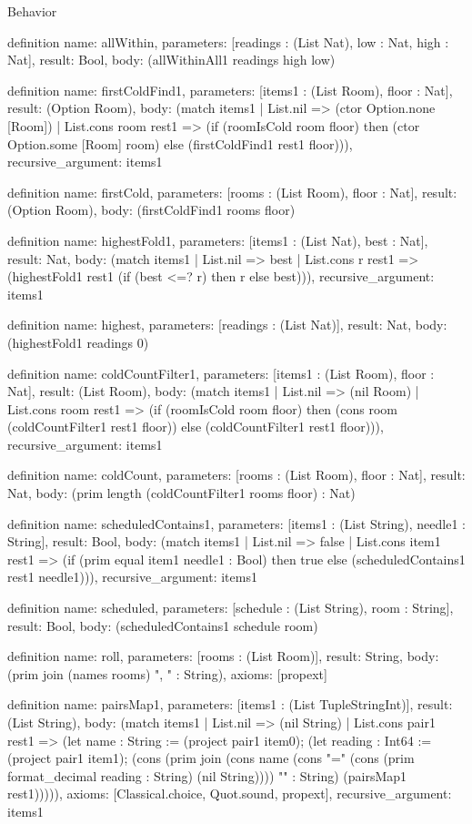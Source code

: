 \begin{lexlean}{Behavior}
\begin{semanticmodule}
definition{
  name: allWithin,
  parameters: [readings : (List Nat), low : Nat, high : Nat],
  result: Bool,
  body: (allWithinAll1 readings high low)
}

definition{
  name: firstColdFind1,
  parameters: [items1 : (List Room), floor : Nat],
  result: (Option Room),
  body: (match items1
    | List.nil => (ctor Option.none [Room])
    | List.cons room rest1 => (if (roomIsCold room floor) then (ctor Option.some [Room] room) else (firstColdFind1 rest1 floor))),
  recursive_argument: items1
}

definition{
  name: firstCold,
  parameters: [rooms : (List Room), floor : Nat],
  result: (Option Room),
  body: (firstColdFind1 rooms floor)
}

definition{
  name: highestFold1,
  parameters: [items1 : (List Nat), best : Nat],
  result: Nat,
  body: (match items1
    | List.nil => best
    | List.cons r rest1 => (highestFold1 rest1 (if (best <=? r) then r else best))),
  recursive_argument: items1
}

definition{
  name: highest,
  parameters: [readings : (List Nat)],
  result: Nat,
  body: (highestFold1 readings 0)
}

definition{
  name: coldCountFilter1,
  parameters: [items1 : (List Room), floor : Nat],
  result: (List Room),
  body: (match items1
    | List.nil => (nil Room)
    | List.cons room rest1 => (if (roomIsCold room floor) then (cons room (coldCountFilter1 rest1 floor)) else (coldCountFilter1 rest1 floor))),
  recursive_argument: items1
}

definition{
  name: coldCount,
  parameters: [rooms : (List Room), floor : Nat],
  result: Nat,
  body: (prim length (coldCountFilter1 rooms floor) : Nat)
}

definition{
  name: scheduledContains1,
  parameters: [items1 : (List String), needle1 : String],
  result: Bool,
  body: (match items1
    | List.nil => false
    | List.cons item1 rest1 => (if (prim equal item1 needle1 : Bool) then true else (scheduledContains1 rest1 needle1))),
  recursive_argument: items1
}

definition{
  name: scheduled,
  parameters: [schedule : (List String), room : String],
  result: Bool,
  body: (scheduledContains1 schedule room)
}

definition{
  name: roll,
  parameters: [rooms : (List Room)],
  result: String,
  body: (prim join (names rooms) ", " : String),
  axioms: [propext]
}

definition{
  name: pairsMap1,
  parameters: [items1 : (List TupleStringInt)],
  result: (List String),
  body: (match items1
    | List.nil => (nil String)
    | List.cons pair1 rest1 => (let name : String := (project pair1 item0); (let reading : Int64 := (project pair1 item1); (cons (prim join (cons name (cons "=" (cons (prim format_decimal reading : String) (nil String)))) "" : String) (pairsMap1 rest1))))),
  axioms: [Classical.choice, Quot.sound, propext],
  recursive_argument: items1
}


\end{semanticmodule}
\end{lexlean}
